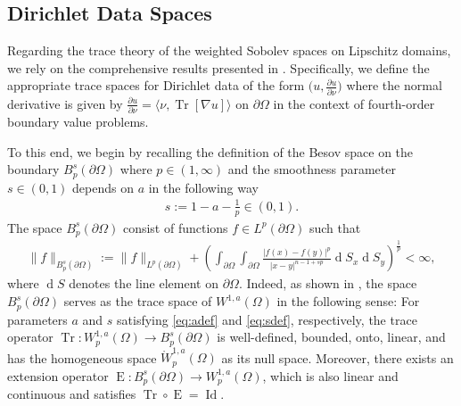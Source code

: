 \documentclass[12pt,a4paper,twoside]{article}
\newcommand{\diff}{\operatorname{d}\!}
\begin{document}
 
\subsection{Dirichlet Data Spaces}
\label{subsec:dirichdt}
Regarding the trace theory of the weighted Sobolev spaces on Lipschitz domains, we rely on the comprehensive results presented in \cite[p. 208 Chapter 7]{maz2010dirichlet}. Specifically, we define the appropriate trace spaces for Dirichlet data of the form $\big( u, \frac{\partial u}{ \partial \nu} \big)$ where the normal derivative is given by $\frac{\partial u}{ \partial \nu} = \langle \nu ,\operatorname{Tr}[\nabla u]\rangle$ on $\partial\Omega$ in the context of fourth-order boundary value problems. 

To this end, we begin by recalling the definition of the Besov space on the boundary $B^s_p(\partial\Omega)$ where $p\in(1,\infty)$ and the smoothness parameter $s\in(0,1)$ depends on $a$ in the following way
\begin{align}
    s:=1-a - \frac{1}{p} \in(0,1). \label{eq:sdef} %
\end{align}
 The space  $B^s_p(\partial\Omega)$ consist of functions   $f\in L^p(\partial\Omega)$ such that
\begin{align*}
 \| f\| _{B^s_p(\partial\Omega)}:= \| f\|_{L^p(\partial\Omega)} 
 + \left(\int_{\partial\Omega}\int_{\partial\Omega} \frac{\big| f(x)-f(y) \big|^p}{|x-y|^{n-1+sp}} \diff S_x \diff S_y \right)^\frac{1}{p}< \infty,
\end{align*}
where $\diff S$ denotes the line element on $\partial\Omega$. 
Indeed, as shown in \cite[Lemma 1, p. 39]{maz2011recent}, the space $B^s_p(\partial\Omega)$ serves as the trace space of $W^{1,a}(\Omega)$  in the following sense: For parameters $a$ and $s$ satisfying \eqref{eq:adef} and \eqref{eq:sdef}, respectively, the trace operator
$
\operatorname{Tr}: W^{1,a}_p(\Omega) \to B^s_p(\partial\Omega)
$
is well-defined,  bounded, onto,  linear, and has the homogeneous space $\mathring{W}^{1,a}_p(\Omega)$ as its null space. Moreover, there exists an extension  operator $\operatorname{E}:  B^s_p(\partial\Omega) \to W^{1,a}_p(\Omega) $, which is also linear and continuous and satisfies $\operatorname{Tr}\circ \operatorname{E}= \operatorname{Id}$. 
\end{document}
